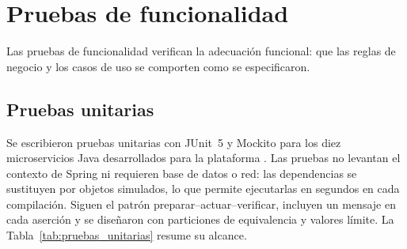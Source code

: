 	\section{Pruebas de funcionalidad}
	\label{sec:pruebas_funcionalidad}
	Las pruebas de funcionalidad verifican la adecuación funcional: que las reglas de negocio y los
	casos de uso se comporten como se especificaron.

	\subsection{Pruebas unitarias}
	Se escribieron pruebas unitarias con JUnit~5 y Mockito para los diez microservicios Java
	desarrollados para la plataforma \cite{junit5, mockito}. Las pruebas no levantan el contexto de
	Spring ni requieren base de datos o red: las dependencias se sustituyen por objetos simulados, lo que
	permite ejecutarlas en segundos en cada compilación. Siguen el patrón preparar--actuar--verificar, incluyen
	un mensaje en cada aserción y se diseñaron con particiones de equivalencia y valores límite. La
	Tabla~\ref{tab:pruebas_unitarias} resume su alcance.

